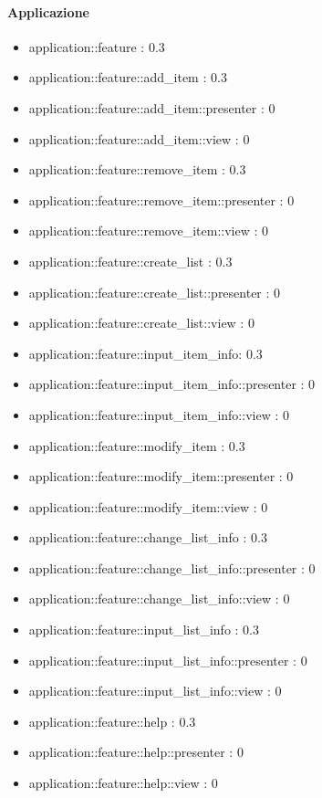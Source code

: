 \paragraph{Applicazione}

\begin{itemize}

\item application::feature : 0.3
\item application::feature::add\_item : 0.3
\item application::feature::add\_item::presenter : 0
\item application::feature::add\_item::view : 0
\item application::feature::remove\_item : 0.3
\item application::feature::remove\_item::presenter : 0
\item application::feature::remove\_item::view : 0
\item application::feature::create\_list : 0.3
\item application::feature::create\_list::presenter : 0
\item application::feature::create\_list::view : 0
\item application::feature::input\_item\_info: 0.3
\item application::feature::input\_item\_info::presenter : 0
\item application::feature::input\_item\_info::view : 0
\item application::feature::modify\_item : 0.3
\item application::feature::modify\_item::presenter : 0
\item application::feature::modify\_item::view : 0
\item application::feature::change\_list\_info : 0.3
\item application::feature::change\_list\_info::presenter : 0
\item application::feature::change\_list\_info::view : 0
\item application::feature::input\_list\_info : 0.3
\item application::feature::input\_list\_info::presenter : 0
\item application::feature::input\_list\_info::view : 0
\item application::feature::help : 0.3
\item application::feature::help::presenter : 0
\item application::feature::help::view : 0

\end{itemize}
